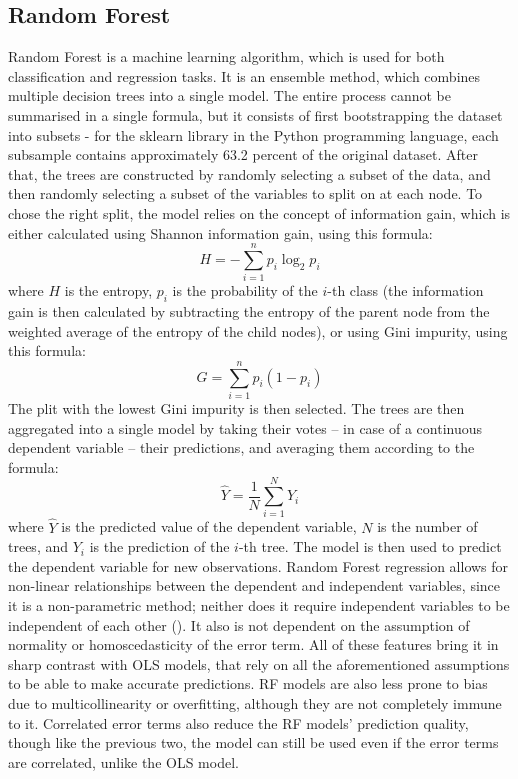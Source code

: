 \documentclass[12pt]{report}
\begin{document}
\subsection{Random Forest}
Random Forest is a machine learning algorithm, which is used for both classification and regression tasks. It is an ensemble method, which combines multiple decision trees into a single model. The entire process cannot be summarised in a single formula, but it consists of first bootstrapping the dataset into subsets - for the sklearn library in the Python programming language, each subsample contains approximately 63.2 percent of the original dataset\cite{Steorts15}. After that, the trees are constructed by randomly selecting a subset of the data, and then randomly selecting a subset of the variables to split on at each node. To chose the right split, the model relies on the concept of information gain, which is either calculated using Shannon information gain, using this formula:
\begin{equation}
	H = -\sum_{i=1}^{n} p_i \log_2 p_i
\end{equation}
where $H$ is the entropy, $p_i$ is the probability of the $i$-th class (the information gain is then calculated by subtracting the entropy of the parent node from the weighted average of the entropy of the child nodes), or using Gini impurity, using this formula:
\begin{equation}
	G = \sum_{i=1}^{n} p_i (1 - p_i)
\end{equation}
The plit with the lowest Gini impurity is then selected. The trees are then aggregated into a single model by taking their votes -- in case of a continuous dependent variable -- their predictions, and averaging them according to the formula:
\begin{equation}
	\hat{Y} = \frac{1}{N} \sum_{i=1}^{N} Y_i
\end{equation}
where $\hat{Y}$ is the predicted value of the dependent variable, $N$ is the number of trees, and $Y_i$ is the prediction of the $i$-th tree. The model is then used to predict the dependent variable for new observations.
Random Forest regression allows for non-linear relationships between the dependent and independent variables, since it is a non-parametric method; neither does it require independent variables to be independent of each other (\cite{Stekhoven2011}). It also is not dependent on the assumption of normality or homoscedasticity of the error term. All of these features bring it in sharp contrast with OLS models, that rely on all the aforementioned assumptions to be able to make accurate predictions. RF models are also less prone to bias due to multicollinearity or overfitting, although they are not completely immune to it. Correlated error terms also reduce the RF models' prediction quality, though like the previous two, the model can still be used even if the error terms are correlated, unlike the OLS model.
\end{document}
